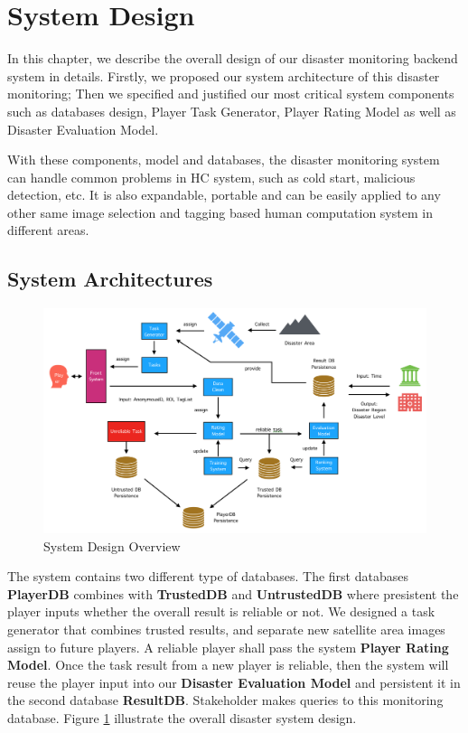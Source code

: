 \section{System Design}

In this chapter, we describe the overall design of our disaster monitoring backend system in details.
Firstly, we proposed our system architecture of this disaster monitoring;
Then we specified and justified our most critical system components such as databases design, 
Player Task Generator, Player Rating Model as well as Disaster Evaluation Model.

With these components, model and databases, the disaster monitoring system can handle
common problems in HC system, such as cold start, malicious detection, etc. It is also expandable,
portable and can be easily applied to any other same image selection and tagging based
human computation system in different areas.

\subsection{System Architectures}

\begin{figure}[htp]
\centering
\includegraphics[width=\textwidth]{figures/system2}
\caption{System Design Overview}
\label{fig:arch}
\end{figure}

The system contains two different type of databases. The first databases \textbf{PlayerDB}
combines with \textbf{TrustedDB} and \textbf{UntrustedDB} where presistent 
the player inputs whether the overall result is reliable or not. 
We designed a task generator that combines trusted results, and separate new satellite area images assign to future players. 
A reliable player shall pass the system \textbf{Player Rating Model}. 
Once the task result from a new player is reliable, then the system will reuse 
the player input into our \textbf{Disaster Evaluation Model} and persistent it 
in the second database \textbf{ResultDB}. Stakeholder makes queries to this monitoring database. 
Figure \ref{fig:arch} illustrate the overall disaster system design.

